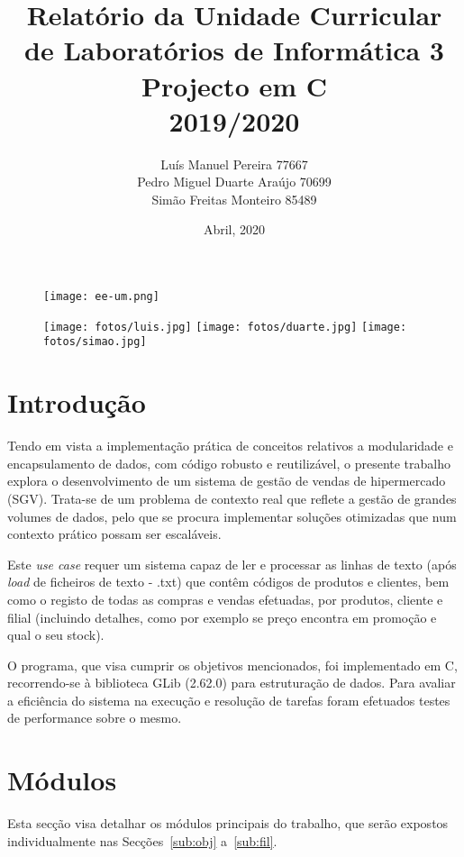 \documentclass{article}
\title{Relatório da Unidade Curricular \\ de Laboratórios de Informática 3 \\  Projecto em C \\ 2019/2020}
\author{Luís Manuel Pereira 77667 \\ Pedro Miguel Duarte Araújo 70699 \\ Simão Freitas Monteiro  85489}
\date{Abril, 2020}
\begin{document}
\begin{figure}[!t]
\texttt{[image: ee-um.png]}
\centering
\end{figure}

\begin{figure}[!b]
\texttt{[image: fotos/luis.jpg]}%
\endminipage\hfill
{}
\texttt{[image: fotos/duarte.jpg]}
\endminipage\hfill
{}%
\texttt{[image: fotos/simao.jpg]} 
\endminipage
\end{figure}

\maketitle
\newpage
\tableofcontents
\newpage
\section{Introdução}\label{sec:intro}

Tendo em vista a implementação prática de conceitos relativos a modularidade e encapsulamento de dados, com código robusto e reutilizável, o presente trabalho explora o desenvolvimento de um sistema de gestão de vendas de hipermercado (SGV). Trata-se de um problema de contexto real que reflete a gestão de grandes volumes de dados, pelo que se procura implementar soluções otimizadas que num contexto prático possam ser escaláveis.  

Este \textit{use case} requer um sistema capaz de ler e processar as linhas de texto (após \textit{load} de ficheiros de texto - .txt) que contêm códigos de produtos e clientes, bem como o registo de todas as compras e vendas efetuadas, por produtos, cliente e filial (incluindo detalhes, como por exemplo se preço encontra em promoção e qual o seu stock).   

O programa, que visa cumprir os objetivos mencionados, foi implementado em C, recorrendo-se à biblioteca GLib (2.62.0) para estruturação de dados. Para avaliar a eficiência do sistema na execução e resolução de tarefas foram efetuados testes de performance sobre o mesmo.  

\section{Módulos}\label{sec:modelos}

Esta secção visa detalhar os módulos principais do trabalho, que serão expostos individualmente nas Secções~\ref{sub:obj} a~\ref{sub:fil}. 
\end{document}
